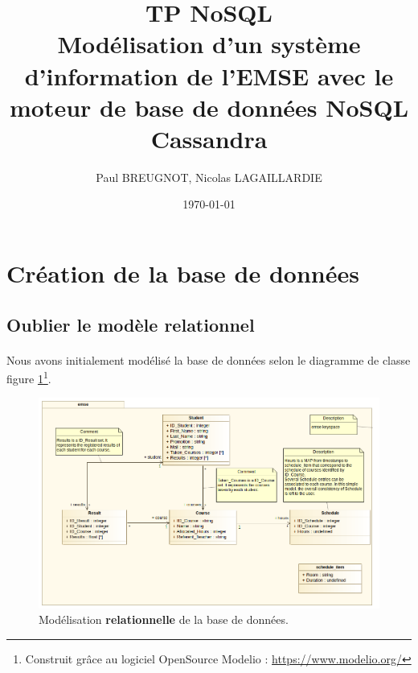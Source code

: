 \documentclass[a4paper, 11pt]{article}
\begin{document}
\title{TP NoSQL\\Modélisation d'un système d'information de l'EMSE avec le moteur de base de données NoSQL Cassandra}
\author{Paul BREUGNOT, Nicolas LAGAILLARDIE}
\date{\today} 

\maketitle

\newpage

\tableofcontents

\newpage

\section{Création de la base de données}
\subsection{Oublier le modèle relationnel}

\paragraph{}
Nous avons initialement modélisé la base de données selon le diagramme de classe figure \ref{relationnal_diagram}\footnote{Construit grâce au logiciel OpenSource Modelio : \url{https://www.modelio.org/}}.

\begin{figure}[h]
\centering
\includegraphics[width=\textwidth]{images/relationnal_class_diagram.png}
\caption{Modélisation \textbf{relationnelle} de la base de données.}
\label{relationnal_diagram}
\end{figure}
\end{document}
